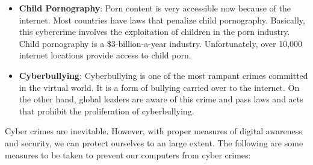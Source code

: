 \documentclass [12pt, a4paper]{article}
\begin{document}
\begin{itemize}
\item \textbf{Child Pornography}: Porn content is very accessible now because of the internet. Most countries have laws that penalize child pornography. Basically, this cybercrime involves the exploitation of children in the porn industry. Child pornography is a \$3-billion-a-year industry. Unfortunately, over 10,000 internet locations provide access to child porn.

\item \textbf{Cyberbullying}: Cyberbullying is one of the most rampant crimes committed in the virtual world. It is a form of bullying carried over to the internet. On the other hand, global leaders are aware of this crime and pass laws and acts that prohibit the proliferation of cyberbullying.

\end{itemize}

Cyber crimes are inevitable. However, with proper measures of digital awareness and security, we can protect ourselves to an large extent. The following are some measures to be taken to prevent our computers from cyber crimes:
\end{document}
